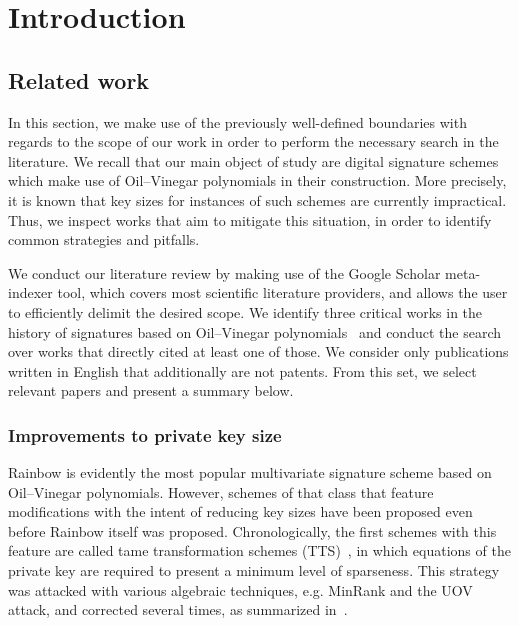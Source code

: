 \documentclass[draft, 12pt, a4paper, oneside]{memoir}
\theoremstyle{definition}
\begin{document}
\tableofcontents*

\chapter{Introduction}\label{chapter:intro}


\section{Related work}\label{sec:related}

In this section, we make use of the previously well-defined boundaries with regards to the scope of our work in order to perform the necessary search in the literature. We recall that our main object of study are digital signature schemes which make use of Oil--Vinegar polynomials in their construction. More precisely, it is known that key sizes for instances of such schemes are currently impractical. Thus, we inspect works that aim to mitigate this situation, in order to identify common strategies and pitfalls.

We conduct our literature review by making use of the Google Scholar meta-indexer tool, which covers most scientific literature providers, and allows the user to efficiently delimit the desired scope. We identify three critical works in the history of signatures based on Oil--Vinegar polynomials~\cite{Patarin:199709,Kipnis:199904,Ding:200506} and conduct the search over works that directly cited at least one of those. We consider only publications written in English that additionally are not patents. From this set, we select relevant papers and present a summary below.

\subsection{Improvements to private key size}\label{subsec:priv}

Rainbow is evidently the most popular multivariate signature scheme based on Oil--Vinegar polynomials. However, schemes of that class that feature modifications with the intent of reducing key sizes have been proposed even before Rainbow itself was proposed. Chronologically, the first schemes with this feature are called tame transformation schemes (TTS)~\cite{Chen:200210}, in which equations of the private key are required to present a minimum level of sparseness. This strategy was attacked with various algebraic techniques, e.g. MinRank and the UOV attack, and corrected several times, as summarized in~\cite{Ding:200604}.
\end{document}
